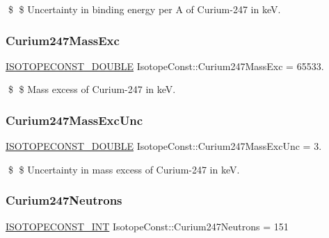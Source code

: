 \$ \$ Uncertainty in binding energy per A of Curium-\/247 in keV. \mbox{\label{group___isotope_const-_curium-_cm247_ga7db2e22adf3d9e45f41fc4ae682688df}} 
\subsubsection{\texorpdfstring{Curium247\+Mass\+Exc}{Curium247MassExc}}
{\footnotesize\ttfamily \mbox{\hyperlink{group___isotope_const-_macros_ga8f45a7272ce02c0b4c65c44636ed719a}{I\+S\+O\+T\+O\+P\+E\+C\+O\+N\+S\+T\+\_\+\+D\+O\+U\+B\+LE}} Isotope\+Const\+::\+Curium247\+Mass\+Exc = 65533.}

\$ \$ Mass excess of Curium-\/247 in keV. \mbox{\label{group___isotope_const-_curium-_cm247_gad9a733553adbac9c14dc339c9ac9391e}} 
\subsubsection{\texorpdfstring{Curium247\+Mass\+Exc\+Unc}{Curium247MassExcUnc}}
{\footnotesize\ttfamily \mbox{\hyperlink{group___isotope_const-_macros_ga8f45a7272ce02c0b4c65c44636ed719a}{I\+S\+O\+T\+O\+P\+E\+C\+O\+N\+S\+T\+\_\+\+D\+O\+U\+B\+LE}} Isotope\+Const\+::\+Curium247\+Mass\+Exc\+Unc = 3.}

\$ \$ Uncertainty in mass excess of Curium-\/247 in keV. \mbox{\label{group___isotope_const-_curium-_cm247_ga4f86f6a54d7c28a8da0c777e1cfae00c}} 
\subsubsection{\texorpdfstring{Curium247\+Neutrons}{Curium247Neutrons}}
{\footnotesize\ttfamily \mbox{\hyperlink{group___isotope_const-_macros_ga5f18360b3e99483a35c32d789e62621c}{I\+S\+O\+T\+O\+P\+E\+C\+O\+N\+S\+T\+\_\+\+I\+NT}} Isotope\+Const\+::\+Curium247\+Neutrons = 151}

